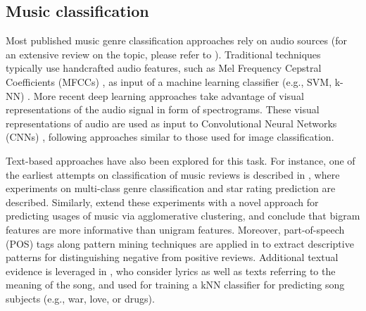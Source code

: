 \subsection{Music classification}
\label{sec:SOA:mir:classfication}


Most published music genre classification approaches rely on audio sources (for an extensive review on the topic, please refer to \cite{sturm2012survey,bogdanov2016cross}).
Traditional techniques typically use handcrafted audio features, such as Mel Frequency Cepstral Coefficients (MFCCs) \citep{logan2000mel}, as input of a machine learning classifier (e.g., SVM, k-NN) \citep{Tzanetakis2002,seyerlehner2010using}.
More recent deep learning approaches take advantage of visual representations of the audio signal in form of spectrograms.
These visual representations of audio are used as input to Convolutional Neural Networks (CNNs) \citep{dieleman2011audio,dieleman2014end,pons2016experimenting,Choi2016,choi2016convolutional}, following approaches similar to those used for image classification.

Text-based approaches have also been explored for this task. For instance, one of the earliest attempts on classification of music reviews is described in \citep{Hu2005}, where experiments on multi-class genre classification and star rating prediction are described. Similarly, \citep{Hu2006} extend these experiments with a novel approach for predicting usages of music via agglomerative clustering, and conclude that bigram features are more informative than unigram features. 
Moreover, part-of-speech (POS) tags along pattern mining techniques are applied in \cite{Downie2006} to extract descriptive patterns for distinguishing negative from positive reviews. Additional textual evidence is leveraged in \cite{Choi2014}, who consider lyrics as well as texts referring to the meaning of the song, and used for training a kNN classifier for predicting song subjects (e.g., war, love, or drugs).

